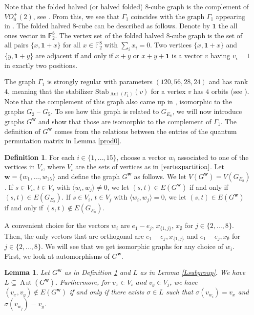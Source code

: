 \documentclass[11pt]{article}
\newtheorem{lemm}[theo]{Lemma}
\theoremstyle{definition}
\newtheorem{defi}[theo]{Definition}
\numberwithin{equation}{section}
\newcommand{\F}{\mathbb{F}}
\DeclareMathOperator{\aut}{Aut}
\begin{document}
Note that the folded halved (or halved folded) $8$-cube graph is the complement of $VO_6^+(2)$, see \cite[Section 10.26]{BVM}. From this, we see that $\Gamma_1$ coincides with the graph $\Gamma_1$ appearing in \cite{BIK}. The folded halved $8$-cube can be described as follows. Denote by $\mathbf{1}$ the all ones vector in $\F_2^8$. The vertex set of the folded halved $8$-cube graph is the set of all pairs $\{x,\mathbf{1}+x\}$ for all $x\in \F_2^8$ with $\sum_i x_i=0$. Two vertices $\{x,\mathbf{1}+x\}$ and $\{y,\mathbf{1}+y\}$ are adjacent if and only if $x+y$ or $x+y+\mathbf{1}$ is a vector $v$ having $v_i=1$ in exactly two positions. 


The graph $\Gamma_1$ is strongly regular with parameters $(120, 56, 28, 24)$ and has rank $4$, meaning that the stabilizer $\mathrm{Stab}_{\aut(\Gamma_1)}(v)$ for a vertex $v$ has $4$ orbits (see \cite{BIK}). Note that the complement of this graph also came up in \cite[Table 2.2]{MS}, isomorphic to the graphs $G_2$ -- $G_5$. To see how this graph is related to $G_{E_8}$, we will now introduce graphs $G^{\boldsymbol{w}}$ and show that those are isomorphic to the complement of $\Gamma_1$. The definition of $G^{\boldsymbol{w}}$ comes from the relations between the entries of the quantum permutation matrix in Lemma \ref{prod0}. 

\begin{defi}\label{defqisograph}
For each $i \in \{1,\dots, 15\}$, choose a vector $w_i$ associated to one of the vertices in $V_i$, where $V_i$ are the sets of vertices as in $\eqref{vertexpartition}$. Let $\boldsymbol{w}=\{w_1, \dots, w_{15}\}$ and define the graph $G^{\boldsymbol{w}}$ as follows. We let $V(G^{\boldsymbol{w}})=V(G_{E_8})$. If $s\in V_i$, $t\in V_j$ with $\langle w_i, w_j\rangle \neq 0$, we let $(s,t)\in E(G^{\boldsymbol{w}})$ if and only if $(s,t)\in E(G_{E_8})$. If $s\in V_i$, $t\in V_j$ with $\langle w_i, w_j\rangle = 0$, we let $(s,t)\in E(G^{\boldsymbol{w}})$ if and only if $(s,t)\notin E(G_{E_8})$. 
\end{defi}

A convenient choice for the vectors $w_i$ are $e_1-e_j$, $x_{\{1,j\}}$, $x_{\emptyset}$ for $j \in \{2,\dots, 8\}$. Then, the only vectors that are orthogonal are $e_1-e_j, x_{\{1,j\}}$ and $e_1-e_j, x_{\emptyset}$ for $j \in \{2,\dots, 8\}$. We will see that we get isomorphic graphs for any choice of $w_i$. First, we look at automorphisms of $G^{\boldsymbol{w}}$. 

\begin{lemm}\label{autsG'}
Let $G^{\boldsymbol{w}}$ as in Definition \ref{defqisograph} and $L$ as in Lemma \ref{Lsubgroup}. We have $L \subseteq \aut(G^{\boldsymbol{w}})$. Furthermore, for $v_x \in V_i$ and $v_y \in V_j$, we have $(v_x,v_y) \notin E(G^{\boldsymbol{w}})$ if and only if there exists $\sigma\in L$ such that $\sigma(v_{w_i})=v_x$ and $\sigma(v_{w_j})=v_y$.
\end{lemm}
\end{document}
